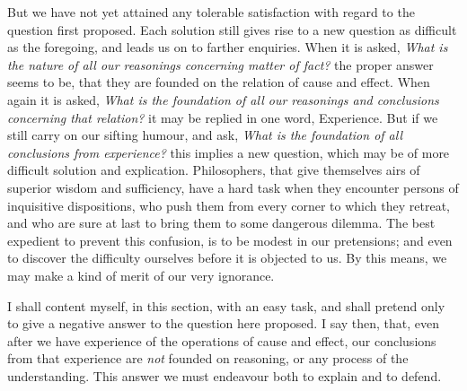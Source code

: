 \documentclass[]{article}
\begin{document}
\begin{sectionbody}


\humeparagraph  But we have not yet attained any tolerable satisfaction with regard to the question first proposed. Each solution still gives rise to a new question as difficult as the foregoing, and leads us on to farther enquiries. When it is asked, \emph{What is the nature of all our reasonings concerning matter of fact?} the proper answer seems to be, that they are founded on the relation of cause and effect. When again it is asked, \emph{What is the foundation of all our reasonings and conclusions concerning that relation?} it may be replied in one word, Experience. But if we still carry on our sifting humour, and ask, \emph{What is the foundation of all conclusions from experience?} this implies a new question, which may be of more difficult solution and explication. Philosophers, that give themselves airs of superior wisdom and sufficiency, have a hard task when they encounter persons of inquisitive dispositions, who push them from every corner to which they retreat, and who are sure at last to bring them to some dangerous dilemma. The best expedient to prevent this confusion, is to be modest in our pretensions; and even to discover the difficulty ourselves before it is objected to us. By this means, we may make a kind of merit of our very ignorance.

\humeparagraph  I shall content myself, in this section, with an easy task, and shall pretend only to give a negative answer to the question here proposed. I say then, that, even after we have experience of the operations of cause and effect, our conclusions from that experience are \emph{not} founded on reasoning, or any process of the understanding. This answer we must endeavour both to explain and to defend.


\end{sectionbody}
\end{document}
